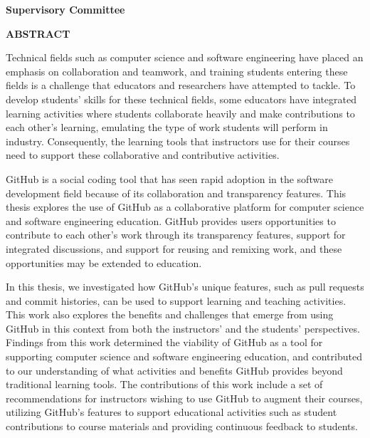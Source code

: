 \newpage
{}

\noindent \textbf{Supervisory Committee}
\tpbreak
\panel

\begin{center}
\textbf{ABSTRACT}
\end{center}

Technical fields such as computer science and software engineering have placed an emphasis on collaboration and teamwork, and training students entering these fields is a challenge that educators and researchers have attempted to tackle. To develop students' skills for these technical fields, some educators have integrated learning activities where students collaborate heavily and make contributions to each other's learning, emulating the type of work students will perform in industry. Consequently, the learning tools that instructors use for their courses need to support these collaborative and contributive activities.

GitHub is a social coding tool that has seen rapid adoption in the software development field because of its collaboration and transparency features. This thesis explores the use of GitHub as a collaborative platform for computer science and software engineering education. GitHub provides users opportunities to contribute to each other's work through its transparency features, support for integrated discussions, and support for reusing and remixing work, and these opportunities may be extended to education.

In this thesis, we investigated how GitHub's unique features, such as pull requests and commit histories, can be used to support learning and teaching activities. This work also explores the benefits and challenges that emerge from using GitHub in this context from both the instructors' and the students' perspectives. Findings from this work determined the viability of GitHub as a tool for supporting computer science and software engineering education, and contributed to our understanding of what activities and benefits GitHub provides beyond traditional learning tools. The contributions of this work include a set of recommendations for instructors wishing to use GitHub to augment their courses, utilizing GitHub's features to support educational activities such as student contributions to course materials and providing continuous feedback to students.
